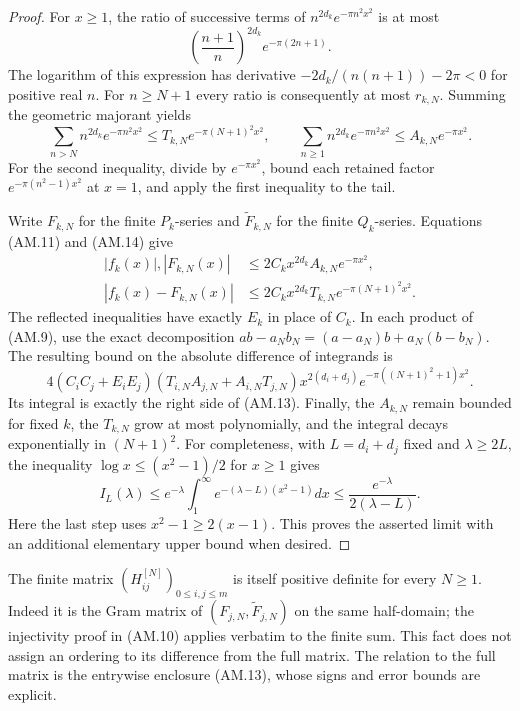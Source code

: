 \begin{proof}
For \(x\geq1\), the ratio of successive terms of
\(n^{2d_k}e^{-\pi n^2x^2}\) is at most
\[
 \left(\frac{n+1}{n}\right)^{2d_k}e^{-\pi(2n+1)}.
\]
The logarithm of this expression has derivative
\(-2d_k/(n(n+1))-2\pi<0\) for positive real \(n\).
For \(n\geq N+1\) every ratio is consequently at most
\(r_{k,N}\).  Summing the geometric majorant yields
\[
 \sum_{n>N}n^{2d_k}e^{-\pi n^2x^2}
  \leq T_{k,N}e^{-\pi(N+1)^2x^2},\qquad
 \sum_{n\geq1}n^{2d_k}e^{-\pi n^2x^2}
  \leq A_{k,N}e^{-\pi x^2}.
 \tag{AM.14}
\]
For the second inequality, divide by \(e^{-\pi x^2}\), bound
each retained factor \(e^{-\pi(n^2-1)x^2}\) at \(x=1\), and
apply the first inequality to the tail.

Write \(F_{k,N}\) for the finite \(P_k\)-series and
\(\widetilde F_{k,N}\) for the finite \(Q_k\)-series.
Equations (AM.11) and (AM.14) give
\[
 \begin{aligned}
 |f_k(x)|, |F_{k,N}(x)|
  &\leq2C_k x^{2d_k}A_{k,N}e^{-\pi x^2},\\
 |f_k(x)-F_{k,N}(x)|
  &\leq2C_kx^{2d_k}T_{k,N}e^{-\pi(N+1)^2x^2}.
 \end{aligned}
\]
The reflected inequalities have exactly \(E_k\) in place of
\(C_k\).  In each product of (AM.9), use the exact decomposition
\(ab-a_Nb_N=(a-a_N)b+a_N(b-b_N)\).  The resulting bound on the
absolute difference of integrands is
\[
 4(C_iC_j+E_iE_j)
 (T_{i,N}A_{j,N}+A_{i,N}T_{j,N})
 x^{2(d_i+d_j)}e^{-\pi((N+1)^2+1)x^2}.
\]
Its integral is exactly the right side of (AM.13).
Finally, the \(A_{k,N}\) remain bounded for fixed \(k\), the
\(T_{k,N}\) grow at most polynomially, and the integral decays
exponentially in \((N+1)^2\).  For completeness, with
\(L=d_i+d_j\) fixed and \(\lambda\geq2L\), the inequality
\(\log x\leq(x^2-1)/2\) for \(x\geq1\) gives
\[
 I_L(\lambda)\leq e^{-\lambda}
   \int_1^\infty e^{-(\lambda-L)(x^2-1)}dx
 \leq \frac{e^{-\lambda}}{2(\lambda-L)}.
\]
Here the last step uses \(x^2-1\geq2(x-1)\).
This proves the asserted limit with an additional elementary
upper bound when desired.
\end{proof}

The finite matrix \((H_{ij}^{[N]})_{0\leq i,j\leq m}\) is itself
positive definite for every \(N\geq1\).  Indeed it is the Gram
matrix of \((F_{j,N},\widetilde F_{j,N})\) on the same half-domain;
the injectivity proof in (AM.10) applies verbatim to the finite
sum.  This fact does not assign an ordering to its difference
from the full matrix.  The relation to the full matrix is the
entrywise enclosure (AM.13), whose signs and error bounds are
explicit.


